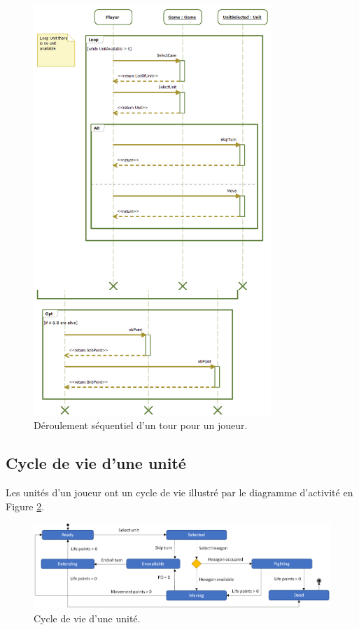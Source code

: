 		
		\begin{figure}
			\begin{center}
				\includegraphics[width=0.8\textwidth]{figure/turn_for_one_player_sequence_diagram.png}
			\end{center}
			\caption{Déroulement séquentiel d'un tour pour un joueur.}
			\label{fig:jetencule}
		\end{figure}
		

	\subsection{Cycle de vie d'une unité}

	Les unités d'un joueur ont un cycle de vie illustré par le diagramme d'activité en {\sc Figure} \ref{fig:arbre_exemple_1}.


	\begin{figure}[h]
	            \centering
	            \includegraphics[width=1\textwidth]{figure/unit_life_cycle_state_diagram.png}
	            \caption{Cycle de vie d'une unité.}
	            \label{fig:arbre_exemple_1}
	\end{figure}
